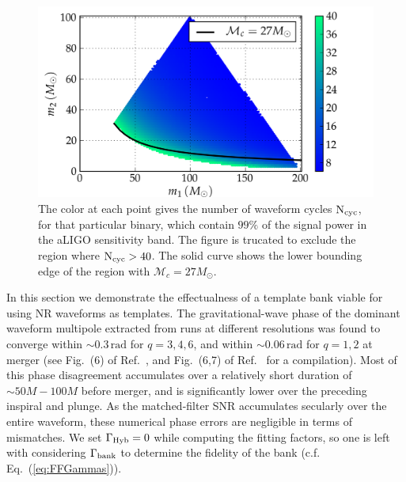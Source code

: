 
\begin{figure}
\centering
\includegraphics[width=1.1\columnwidth]{BBHm1m2_tlen_Ncyc40_0-99_Mchirp27_cropped.png}%
\caption{The color at each point gives the number 
of waveform cycles $\mathrm{N}_{\mathrm{cyc}}$, for that particular binary, which contain 
$99\%$ of the signal power in the aLIGO sensitivity band. The figure is 
trucated to exclude the region where $\mathrm{N}_{\mathrm{cyc}}>40$. The solid curve shows
the lower bounding edge of the region with $\mathcal{M}_c = 27M_\odot$.}
\label{fig:BBHregion}
\end{figure}

In this section we demonstrate the effectualness of a template bank viable
for using NR waveforms as templates. The gravitational-wave phase of the dominant 
waveform multipole 
extracted from runs at different resolutions was found to converge within 
$\sim 0.3\,\mathrm{rad}$ for $q=3,4,6$, and within $\sim 0.06\,\mathrm{rad}$
for $q=1,2$ at merger (see Fig.~(6) of Ref.~\cite{Buchman:2012dw}, and 
Fig.~(6,7) of Ref.~\cite{BuonannoEOBv2Main} for a compilation). Most of this 
phase disagreement accumulates over a relatively short duration of 
$\sim 50M  - 100M$ before merger, and is significantly lower over the preceding
inspiral and plunge. As the matched-filter SNR accumulates secularly over the
entire waveform, 
these numerical phase errors are negligible in terms of mismatches. We set
$\Gamma_{\mathrm{Hyb}} = 0$ while computing the fitting factors, so one is left with
considering $\Gamma_{\mathrm{bank}}$ to determine the fidelity of the bank (c.f.
Eq.~(\ref{eq:FFGammas})).


